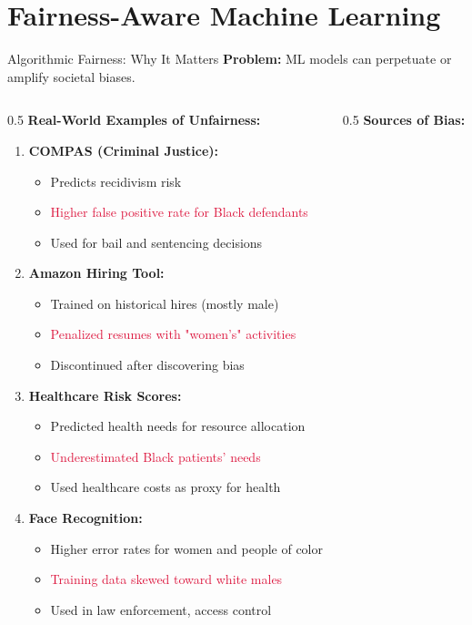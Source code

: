 
\section{Fairness-Aware Machine Learning}

\begin{frame}{Algorithmic Fairness: Why It Matters}
\textbf{Problem:} ML models can perpetuate or amplify societal biases.

\begin{columns}
\begin{column}{0.5\textwidth}
\textbf{Real-World Examples of Unfairness:}

\begin{enumerate}
\item \textbf{COMPAS (Criminal Justice):}
   \begin{itemize}
   \item Predicts recidivism risk
   \item \textcolor{crimson}{Higher false positive rate for Black defendants}
   \item Used for bail and sentencing decisions
   \end{itemize}

\item \textbf{Amazon Hiring Tool:}
   \begin{itemize}
   \item Trained on historical hires (mostly male)
   \item \textcolor{crimson}{Penalized resumes with "women's" activities}
   \item Discontinued after discovering bias
   \end{itemize}

\item \textbf{Healthcare Risk Scores:}
   \begin{itemize}
   \item Predicted health needs for resource allocation
   \item \textcolor{crimson}{Underestimated Black patients' needs}
   \item Used healthcare costs as proxy for health
   \end{itemize}

\item \textbf{Face Recognition:}
   \begin{itemize}
   \item Higher error rates for women and people of color
   \item \textcolor{crimson}{Training data skewed toward white males}
   \item Used in law enforcement, access control
   \end{itemize}
\end{enumerate}
\end{column}
\begin{column}{0.5\textwidth}
\textbf{Sources of Bias:}


\end{column}
\end{columns}
\end{frame}
